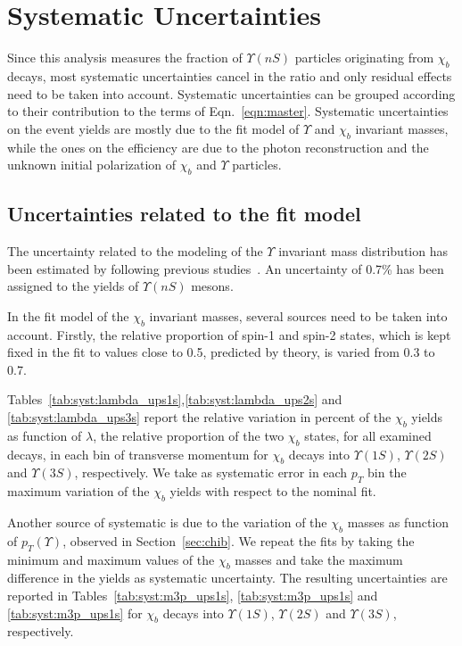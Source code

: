 \section[Systematic]{Systematic Uncertainties}
\label{sec:syst}

Since this analysis measures the fraction of $\Upsilon(nS)$ particles
originating from $\chi_b$ decays, most systematic uncertainties cancel in the
ratio and only residual effects need to be taken into account. Systematic
uncertainties can be grouped according to their contribution to the terms of
Eqn.~\ref{eqn:master}. Systematic uncertainties on the event yields are mostly
due to the fit model of $\Upsilon$ and $\chi_b$ invariant masses, while the
ones on the efficiency are due to the photon reconstruction and the unknown
initial polarization of $\chi_b$ and $\Upsilon$ particles.
 

\subsection{Uncertainties related to the fit model}

The uncertainty related to the modeling of the $\Upsilon$ invariant mass
distribution has been estimated by following previous
studies~\cite{Aaij:2013yaa}. An uncertainty of 0.7\% has been assigned to the
yields of $\Upsilon(nS)$ mesons.

In the fit model of the $\chi_b$ invariant masses, several sources need to be
taken into account. Firstly, the relative proportion of spin-1 and spin-2
states, which is kept fixed in the fit to values close to 0.5, predicted by
theory, is varied from 0.3 to 0.7.


Tables~\ref{tab:syst:lambda_ups1s},\ref{tab:syst:lambda_ups2s} and
\ref{tab:syst:lambda_ups3s} report the relative variation in percent of the
$\chi_b$ yields as function of $\lambda$, the relative proportion of the two
$\chi_b$ states, for all examined decays, in each bin of transverse momentum
for $\chi_b$ decays into $\Upsilon(1S)$, $\Upsilon(2S)$ and $\Upsilon(3S)$,
respectively. We take as systematic error in each $p_T$ bin the maximum
variation of the $\chi_b$ yields with respect to the nominal fit.

Another source of systematic is due to the variation of the $\chi_b$ masses as
function of $p_T(\Upsilon)$, observed in Section~\ref{sec:chib}. We repeat the
fits by taking the minimum and maximum values of the $\chi_b$ masses and take
the maximum difference in the yields as systematic uncertainty. The resulting
uncertainties are reported in Tables~\ref{tab:syst:m3p_ups1s},
\ref{tab:syst:m3p_ups1s} and \ref{tab:syst:m3p_ups1s} for $\chi_b$ decays into
$\Upsilon(1S)$, $\Upsilon(2S)$ and $\Upsilon(3S)$, respectively.
 
